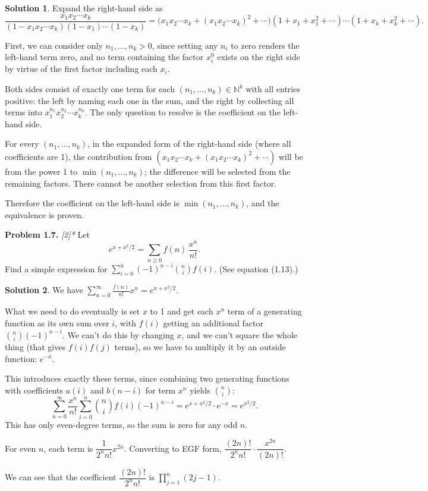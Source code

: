 \documentclass[11pt]{article}
\theoremstyle{definition}
\newtheorem*{solution}{Solution}
\newcounter{probnum}
\newcommand{\problem}[1]{%
  \setcounter{probnum}{#1}%
  \medskip
  \noindent\textbf{Problem 1.#1.}\quad
}
\begin{document}
\begin{solution}
Expand the right-hand side as
\[
  \frac{x_1 x_2 \cdots x_k}{(1-x_1 x_2 \cdots x_k)(1-x_1)\cdots(1-x_k)}
  = \bigl(x_1 x_2 \cdots x_k + (x_1 x_2 \cdots x_k)^2 + \cdots\bigr)
    (1+x_1+x_1^2+\cdots)\cdots(1+x_k+x_k^2+\cdots).
\]

First, we can consider only $n_1,\ldots,n_k > 0$, since setting any $n_i$ to zero
renders the left-hand term zero, and no term containing the factor $x_i^0$ exists on
the right side by virtue of the first factor including each $x_i$.

Both sides consist of exactly one term for each $(n_1,\ldots,n_k) \in \mathbb{N}^k$
with all entries positive: the left by naming each one in the sum, and the right by
collecting all terms into $x_1^{n_1} x_2^{n_2} \cdots x_k^{n_k}$. The only question
to resolve is the coefficient on the left-hand side.

For every $(n_1,\ldots,n_k)$, in the expanded form of the right-hand side (where all
coefficients are 1), the contribution from
$(x_1 x_2 \cdots x_k + (x_1 x_2 \cdots x_k)^2 + \cdots)$ will be from the power 1
to $\min(n_1,\ldots,n_k)$; the difference will be selected from the remaining factors.
There cannot be another selection from this first factor.

Therefore the coefficient on the left-hand side is $\min(n_1,\ldots,n_k)$, and the
equivalence is proven.
\end{solution}

\problem{7} \textit{[2]*}
Let
\[
  e^{x + x^2/2} = \sum_{n\geq 0} f(n)\,\frac{x^n}{n!}.
\]
Find a simple expression for $\displaystyle\sum_{i=0}^{n}(-1)^{n-i}\binom{n}{i}f(i)$.
(See equation (1.13).)

\begin{solution}
We have $\sum_{n=0}^{\infty} \frac{f(n)}{n!}x^n = e^{x+x^2/2}$.

What we need to do eventually is set $x$ to 1 and get each $x^n$ term of a generating
function as its own sum over $i$, with $f(i)$ getting an additional factor
$\binom{n}{i}(-1)^{n-i}$. We can't do this by changing $x$, and we can't square the
whole thing (that gives $f(i)f(j)$ terms), so we have to multiply it by an outside
function: $e^{-x}$.

This introduces exactly these terms, since combining two generating functions with
coefficients $a(i)$ and $b(n-i)$ for term $x^n$ yields $\binom{n}{i}$:
\[
  \sum_{n=0}^{\infty} \frac{x^n}{n!} \sum_{i=0}^{n} \binom{n}{i}f(i)(-1)^{n-i}
  = e^{x+x^2/2} \cdot e^{-x} = e^{x^2/2}.
\]
This has only even-degree terms, so the sum is zero for any odd $n$.

For even $n$, each term is $\dfrac{1}{2^n n!}x^{2n}$. Converting to EGF form,
$\dfrac{(2n)!}{2^n n!} \cdot \dfrac{x^{2n}}{(2n)!}$.

We can see that the coefficient $\dfrac{(2n)!}{2^n n!}$ is $\prod_{j=1}^{n}(2j-1)$.
\end{solution}
\end{document}
